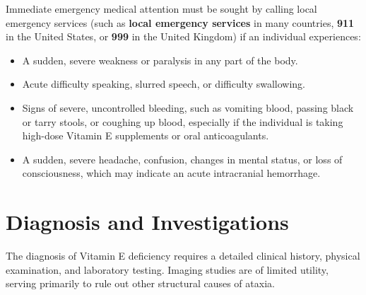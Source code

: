 Immediate emergency medical attention must be sought by calling local emergency services (such as \textbf{local emergency services} in many countries, \textbf{911} in the United States, or \textbf{999} in the United Kingdom) if an individual experiences:
\begin{itemize}
    \item A sudden, severe weakness or paralysis in any part of the body.
    \item Acute difficulty speaking, slurred speech, or difficulty swallowing.
    \item Signs of severe, uncontrolled bleeding, such as vomiting blood, passing black or tarry stools, or coughing up blood, especially if the individual is taking high-dose Vitamin E supplements or oral anticoagulants.
    \item A sudden, severe headache, confusion, changes in mental status, or loss of consciousness, which may indicate an acute intracranial hemorrhage.
\end{itemize}

\section*{Diagnosis and Investigations}
The diagnosis of Vitamin E deficiency requires a detailed clinical history, physical examination, and laboratory testing. Imaging studies are of limited utility, serving primarily to rule out other structural causes of ataxia.

